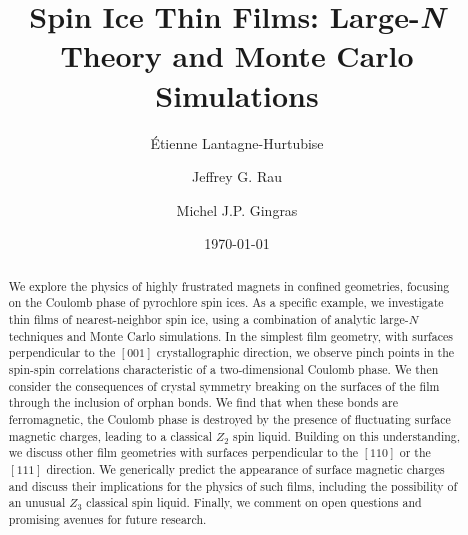 \documentclass[aps,prx,reprint,runinaddress,superscriptaddress,amsmath,amssymb,floatfix,longbibliography]{revtex4-1}
\begin{document}
\title{Spin Ice Thin Films: Large-\emph{N} Theory and Monte Carlo Simulations}

\author{\'{E}tienne Lantagne-Hurtubise}
%
\author{Jeffrey G. Rau}
%
\author{Michel J.P. Gingras}


\date{\today}

\begin{abstract}
    We explore the physics of highly frustrated magnets in confined geometries, focusing on the Coulomb phase of pyrochlore spin ices. As a specific example, we  investigate thin films of nearest-neighbor spin ice, using a combination of analytic large-$N$ techniques and Monte Carlo simulations. In the simplest film geometry, with surfaces perpendicular to the $[001]$ crystallographic direction, we observe pinch points in the spin-spin correlations characteristic of a two-dimensional Coulomb phase. We then consider the consequences of crystal symmetry breaking on the surfaces of the film through the inclusion of orphan bonds. We find that when these bonds are ferromagnetic, the Coulomb phase is destroyed by the presence of fluctuating surface magnetic charges, leading to a classical $Z_2$ spin liquid. Building on this understanding, we discuss other film geometries with surfaces  perpendicular to the $[110]$ or the $[111]$ direction. We generically predict the appearance of surface magnetic charges and discuss their implications for the physics of such films, including the possibility of an unusual $Z_3$ classical spin liquid. Finally, we comment on open questions and promising avenues for future research.
\end{abstract}

\maketitle
\end{document}
